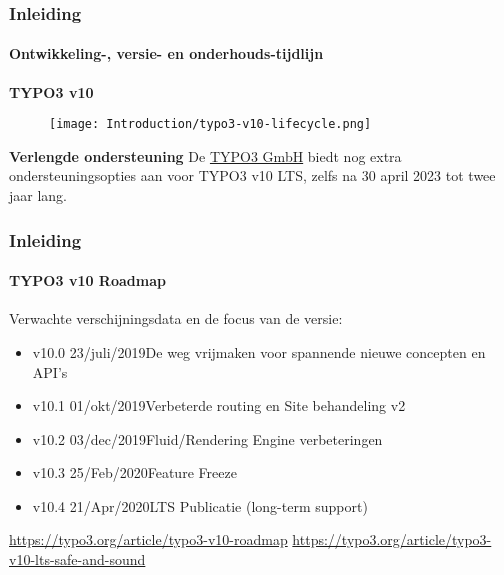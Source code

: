 
\begin{frame}[fragile]
	\frametitle{Inleiding}
	\framesubtitle{Ontwikkeling-, versie- en onderhouds-tijdlijn}

	\textbf{TYPO3 v10}

	\begin{figure}
		\texttt{[image: Introduction/typo3-v10-lifecycle.png]}
	\end{figure}

	\textbf{Verlengde ondersteuning}\newline
	\smaller
	De \href{https://typo3.com}{TYPO3 GmbH} biedt nog extra ondersteuningsopties aan
	voor TYPO3 v10 LTS, zelfs na 30 april 2023 tot twee jaar lang.
	\normalsize

\end{frame}


\begin{frame}[fragile]
	\frametitle{Inleiding}
	\framesubtitle{TYPO3 v10 Roadmap}

	Verwachte verschijningsdata en de focus van de versie:

	\begin{itemize}

		\item v10.0 \tabto{1.1cm}23/juli/2019\tabto{3.4cm}De weg vrijmaken voor spannende nieuwe concepten en API's
		\item v10.1 \tabto{1.1cm}01/okt/2019\tabto{3.4cm}Verbeterde routing en Site behandeling v2
		\item v10.2 \tabto{1.1cm}03/dec/2019\tabto{3.4cm}Fluid/Rendering Engine verbeteringen
		\item v10.3 \tabto{1.1cm}25/Feb/2020\tabto{3.4cm}Feature Freeze
		\item
			\begingroup
				\color{typo3orange}
				v10.4 \tabto{1.1cm}21/Apr/2020\tabto{3.4cm}LTS Publicatie (long-term support)
			\endgroup

	\end{itemize}

	\vspace{0.6cm}
	\smaller
		\url{https://typo3.org/article/typo3-v10-roadmap}\newline
		\url{https://typo3.org/article/typo3-v10-lts-safe-and-sound}
	\normalsize

\end{frame}

